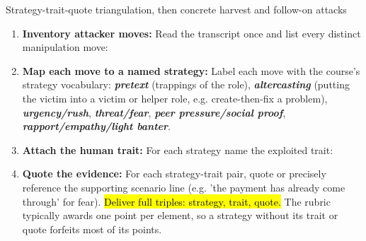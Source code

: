 \documentclass[12pt, a4paper]{article}
\newcommand{\term}[1]{\textbf{\textit{#1}}}        %
\newcommand{\imp}[1]{\hl{#1}}                       %
\begin{document}
\begin{schemebox}{Strategy-trait-quote triangulation, then concrete harvest and follow-on attacks}
\begin{enumerate}[label=\textbf{Step \arabic*:}, leftmargin=*]
    \item \textbf{Inventory attacker moves:} Read the transcript once and list every distinct manipulation move:
    \item \textbf{Map each move to a named strategy:} Label each move with the course's strategy vocabulary: \term{pretext} (trappings of the role), \term{altercasting} (putting the victim into a victim or helper role, e.g. create-then-fix a problem), \term{urgency/rush}, \term{threat/fear}, \term{peer pressure/social proof}, \term{rapport/empathy/light banter}.
    \item \textbf{Attach the human trait:} For each strategy name the exploited trait:
    \item \textbf{Quote the evidence:} For each strategy-trait pair, quote or precisely reference the supporting scenario line (e.g. 'the payment has already come through' for fear). \imp{Deliver full triples: strategy, trait, quote.} The rubric typically awards one point per element, so a strategy without its trait or quote forfeits most of its points.

\end{enumerate}
\end{schemebox}
\end{document}
